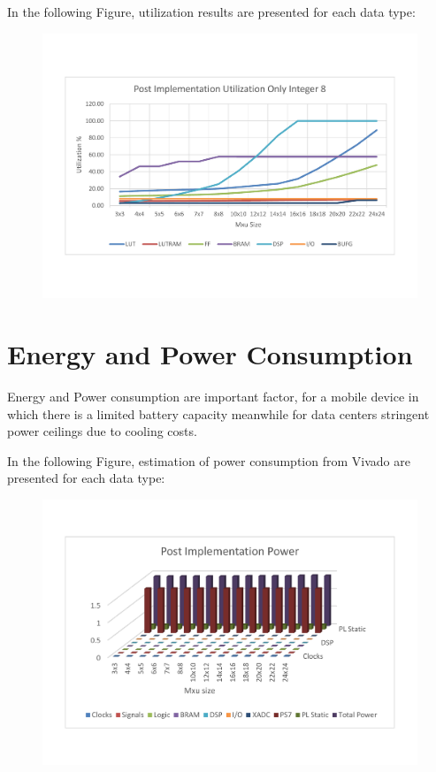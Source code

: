 In the following Figure, utilization results are presented for each data type:
\begin{figure}[!htbp]
\centering
\captionsetup{justification=centering}
\includegraphics[scale=0.5,angle=0]{./figure/graphs/graph_utilization.pdf}
\label{fig:ut8bit}
\end{figure}

\newpage
\section{Energy and Power Consumption}
Energy and Power consumption are important factor, for a mobile device in which there is a limited battery capacity meanwhile for data centers stringent power ceilings due to cooling costs.

In the following Figure, estimation of power consumption from Vivado are presented for each data type:

\begin{figure}[!htbp]
\centering
\captionsetup{justification=centering}
\includegraphics[scale=0.5,angle=0]{./figure/graphs/graph_power.pdf}
\label{fig:pow8bit}
\end{figure}

